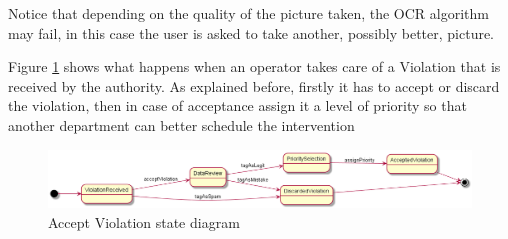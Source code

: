 Notice that depending on the quality of the picture taken, the OCR algorithm may fail, in this case the user is asked to take another, possibly better, picture. 

Figure \ref{fig:acceptViolationDiagram} shows what happens when an operator takes care of a Violation that is received by the authority. As explained before, firstly it has to accept or discard the violation, then in case of acceptance assign it a level of priority so that another department can better schedule the intervention

\begin{figure}[H]
    \centering
    \includegraphics[width=\linewidth]{../diagrams/state_diagram_accept_violation.png}
    \caption{Accept Violation state diagram}
    \label{fig:acceptViolationDiagram}
\end{figure}